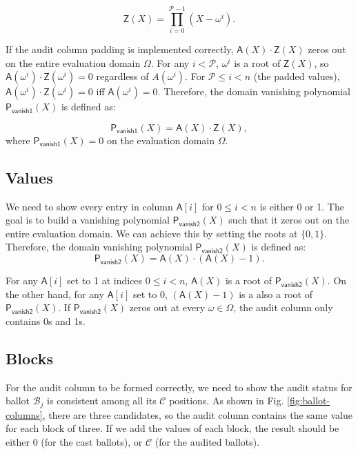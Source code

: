 \begin{equation}
  \label{eq:auditzero}
  \mathsf{Z}(X) = \prod_{i=0}^{\mathcal{P}-1}(X-\omega^i).
\end{equation}

If the audit column padding is implemented correctly, $\mathsf{A}(X)\cdot\mathsf{Z}(X)$ zeros out on the entire evaluation domain $\Omega$. 
For any $i<\mathcal{P}$, $\omega^i$ is a root of $\mathsf{Z}(X)$, 
so $\mathsf{A}(\omega^i)\cdot\mathsf{Z}(\omega^i) = 0$ regardless of $A(\omega^i)$. For $\mathcal{P}\le i<n$ (the padded values), $\mathsf{A}(\omega^i)\cdot\mathsf{Z}(\omega^i) = 0$ iff $\mathsf{A}(\omega^i)=0$. 
Therefore, the domain vanishing polynomial $\mathsf{P_{vanish1}}(X)$ is defined as:


\begin{equation}
  \label{eq:1}
\mathsf{P_{vanish1}}(X) = \mathsf{A}(X)\cdot \mathsf{Z}(X),
\end{equation}
where $\mathsf{P_{vanish1}}(X)=0$ on the evaluation domain $\Omega$.

\subsection{Values}
\label{subsec:values}
We need to show every entry in column $\mathsf{A}[i]$ for $0\le i<n$ is either 0 or 1. The goal is to build a vanishing polynomial $\mathsf{P_{vanish2}}(X)$ such that it zeros out on the entire evaluation domain.
We can achieve this by setting the roots at $\{0,1\}$. Therefore, the domain vanishing polynomial $\mathsf{P_{vanish2}}(X)$ is defined as:
\begin{equation}
  \label{eq:2}
  \mathsf{P_{vanish2}}(X) = \mathsf{A}(X)\cdot (\mathsf{A}(X)-1).
\end{equation}

For any $\mathsf{A}[i]$ set to 1 at indices $0\le i<n$, $\mathsf{A}(X)$ is a root of $\mathsf{P_{vanish2}}(X)$. 
On the other hand, for any $\mathsf{A}[i]$ set to 0, $(\mathsf{A}(X)-1)$ is a also a root of $\mathsf{P_{vanish2}}(X)$.
If $\mathsf{P_{vanish2}}(X)$ zeros out at every $\omega\in\Omega$, the audit column only contains 0s and 1s.

\subsection{Blocks}
\label{subsec:blocks}
For the audit column to be formed correctly, we need to show the audit status for ballot $\mathcal{B}_j$ is consistent among all its $\mathcal{C}$ positions. As shown in Fig. \ref{fig:ballot-columns}, there are three candidates, so the audit column contains the same value for each block of three. 
If we add the values of each block, the result should be either 0 (for the cast ballots), or $\mathcal{C}$ (for the audited ballots).   

